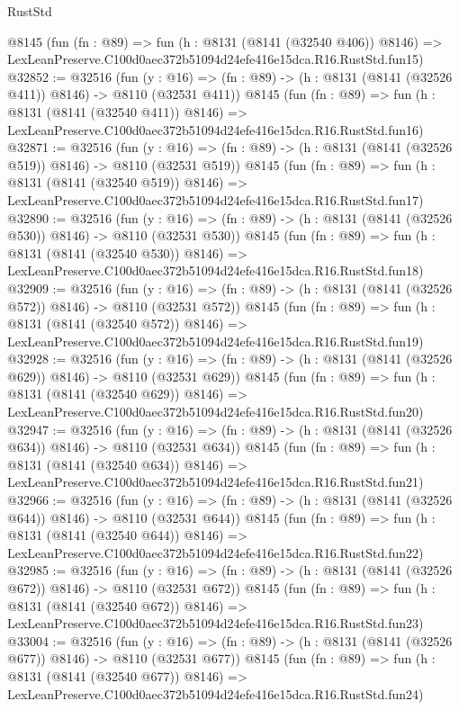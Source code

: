 \begin{lexlean}{RustStd}
\begin{coremodule}
    @8145
    (fun (fn : @89) =>
    fun (h : @8131 (@8141 (@32540 @406)) @8146) =>
    LexLeanPreserve.C100d0aec372b51094d24efe416e15dca.R16.RustStd.fun15)
@32852 := @32516
    (fun (y : @16) => (fn : @89) -> (h : @8131 (@8141 (@32526 @411)) @8146) -> @8110 (@32531 @411))
    @8145
    (fun (fn : @89) =>
    fun (h : @8131 (@8141 (@32540 @411)) @8146) =>
    LexLeanPreserve.C100d0aec372b51094d24efe416e15dca.R16.RustStd.fun16)
@32871 := @32516
    (fun (y : @16) => (fn : @89) -> (h : @8131 (@8141 (@32526 @519)) @8146) -> @8110 (@32531 @519))
    @8145
    (fun (fn : @89) =>
    fun (h : @8131 (@8141 (@32540 @519)) @8146) =>
    LexLeanPreserve.C100d0aec372b51094d24efe416e15dca.R16.RustStd.fun17)
@32890 := @32516
    (fun (y : @16) => (fn : @89) -> (h : @8131 (@8141 (@32526 @530)) @8146) -> @8110 (@32531 @530))
    @8145
    (fun (fn : @89) =>
    fun (h : @8131 (@8141 (@32540 @530)) @8146) =>
    LexLeanPreserve.C100d0aec372b51094d24efe416e15dca.R16.RustStd.fun18)
@32909 := @32516
    (fun (y : @16) => (fn : @89) -> (h : @8131 (@8141 (@32526 @572)) @8146) -> @8110 (@32531 @572))
    @8145
    (fun (fn : @89) =>
    fun (h : @8131 (@8141 (@32540 @572)) @8146) =>
    LexLeanPreserve.C100d0aec372b51094d24efe416e15dca.R16.RustStd.fun19)
@32928 := @32516
    (fun (y : @16) => (fn : @89) -> (h : @8131 (@8141 (@32526 @629)) @8146) -> @8110 (@32531 @629))
    @8145
    (fun (fn : @89) =>
    fun (h : @8131 (@8141 (@32540 @629)) @8146) =>
    LexLeanPreserve.C100d0aec372b51094d24efe416e15dca.R16.RustStd.fun20)
@32947 := @32516
    (fun (y : @16) => (fn : @89) -> (h : @8131 (@8141 (@32526 @634)) @8146) -> @8110 (@32531 @634))
    @8145
    (fun (fn : @89) =>
    fun (h : @8131 (@8141 (@32540 @634)) @8146) =>
    LexLeanPreserve.C100d0aec372b51094d24efe416e15dca.R16.RustStd.fun21)
@32966 := @32516
    (fun (y : @16) => (fn : @89) -> (h : @8131 (@8141 (@32526 @644)) @8146) -> @8110 (@32531 @644))
    @8145
    (fun (fn : @89) =>
    fun (h : @8131 (@8141 (@32540 @644)) @8146) =>
    LexLeanPreserve.C100d0aec372b51094d24efe416e15dca.R16.RustStd.fun22)
@32985 := @32516
    (fun (y : @16) => (fn : @89) -> (h : @8131 (@8141 (@32526 @672)) @8146) -> @8110 (@32531 @672))
    @8145
    (fun (fn : @89) =>
    fun (h : @8131 (@8141 (@32540 @672)) @8146) =>
    LexLeanPreserve.C100d0aec372b51094d24efe416e15dca.R16.RustStd.fun23)
@33004 := @32516
    (fun (y : @16) => (fn : @89) -> (h : @8131 (@8141 (@32526 @677)) @8146) -> @8110 (@32531 @677))
    @8145
    (fun (fn : @89) =>
    fun (h : @8131 (@8141 (@32540 @677)) @8146) =>
    LexLeanPreserve.C100d0aec372b51094d24efe416e15dca.R16.RustStd.fun24)

\end{coremodule}
\end{lexlean}
